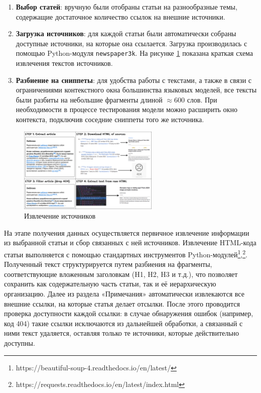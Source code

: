 \documentclass{article}
\theoremstyle{definition}
\theoremstyle{plain}
\begin{document}
\begin{enumerate}

    \item \textbf{Выбор статей}: вручную были отобраны статьи на разнообразные темы, 
    содержащие достаточное количество ссылок на внешние источники.
    
    \item \textbf{Загрузка источников}: для каждой статьи были автоматически собраны доступные источники, на которые она ссылается. 
    Загрузка производилась с помощью Python-модуля \texttt{newspaper3k}. 
    На рисунке \ref{fig:source} показана краткая схема извлечения текстов источников.
    
    \item \textbf{Разбиение на сниппеты}: для удобства работы с текстами, а также в связи с ограничениями контекстного окна большинства языковых моделей, 
    все тексты были разбиты на небольшие фрагменты длиной $\approx 600$ слов. 
    При необходимости в процессе тестирования модели можно расширить окно контекста, подключив соседние сниппеты того же источника.

\end{enumerate}

\begin{figure}[htb]
  \centering
  \includegraphics[width=0.6\textwidth]{figures/Source_extract.png}%
  \caption{Извлечение источников}
  \label{fig:source}
\end{figure}

На этапе получения данных осуществляется первичное извлечение информации из выбранной статьи и сбор связанных с ней источников. 
Извлечение HTML-кода статьи выполняется с помощью стандартных инструментов Python-модулей\footnote{https://beautiful-soup-4.readthedocs.io/en/latest/},\footnote{https://requests.readthedocs.io/en/latest/index.html}. 
Полученный текст структурируется путем разбиения на фрагменты, соответствующие вложенным заголовкам (H1, H2, H3 и т.д.), что позволяет сохранить как содержательную часть статьи, так и её иерархическую организацию. 
Далее из раздела «Примечания» автоматически извлекаются все внешние ссылки, на которые статья делает отсылки. После этого проводится проверка доступности каждой ссылки: в случае обнаружения ошибок (например, код 404) такие ссылки исключаются из дальнейшей обработки, а связанный с ними текст удаляется, оставляя только те источники, которые действительно доступны.
\end{document}
